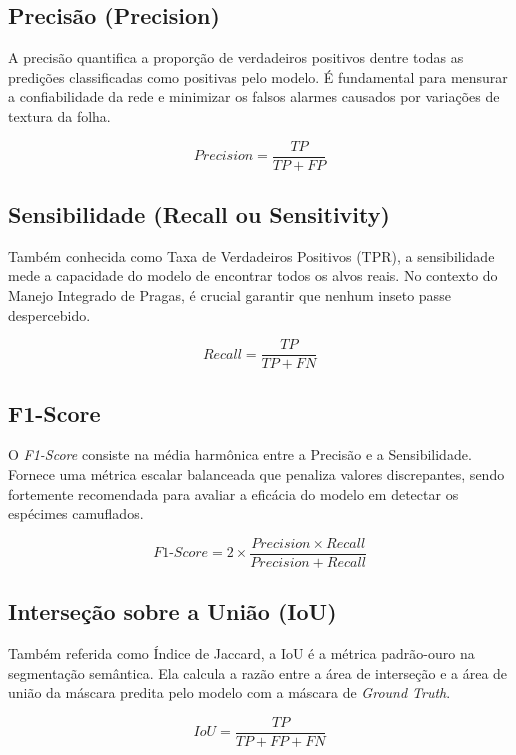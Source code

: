 \subsection{Precisão (Precision)}
A precisão quantifica a proporção de verdadeiros positivos dentre todas as predições classificadas como positivas pelo modelo. É fundamental para mensurar a confiabilidade da rede e minimizar os falsos alarmes causados por variações de textura da folha.

\begin{equation}
    Precision = \frac{TP}{TP + FP}
\end{equation}

\subsection{Sensibilidade (Recall ou Sensitivity)}
Também conhecida como Taxa de Verdadeiros Positivos (TPR), a sensibilidade mede a capacidade do modelo de encontrar todos os alvos reais. No contexto do Manejo Integrado de Pragas, é crucial garantir que nenhum inseto passe despercebido.

\begin{equation}
    Recall = \frac{TP}{TP + FN}
\end{equation}

\subsection{F1-Score}
O \textit{F1-Score} consiste na média harmônica entre a Precisão e a Sensibilidade. Fornece uma métrica escalar balanceada que penaliza valores discrepantes, sendo fortemente recomendada para avaliar a eficácia do modelo em detectar os espécimes camuflados.

\begin{equation}
    F1\text{-}Score = 2 \times \frac{Precision \times Recall}{Precision + Recall}
\end{equation}

\subsection{Interseção sobre a União (IoU)}
Também referida como Índice de Jaccard, a IoU é a métrica padrão-ouro na segmentação semântica. Ela calcula a razão entre a área de interseção e a área de união da máscara predita pelo modelo com a máscara de \textit{Ground Truth}.

\begin{equation}
    IoU = \frac{TP}{TP + FP + FN}
\end{equation}

